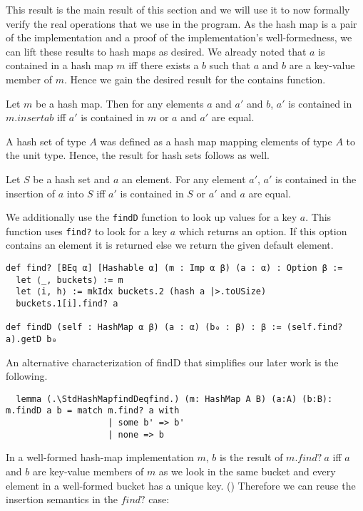 This result is the main result of this section and we will use it to now formally verify the real operations that we use in the program. As the hash map is a pair of the implementation and a proof of the implementation's well-formedness, we can lift these results to hash maps as desired. We already noted that $a$ is contained in a hash map $m$ iff there exists a $b$ such that $a$ and $b$ are a key-value member of $m$. Hence we gain the desired result for the contains function.

\begin{lemma}[\StdHashMapcontainsinsert]
  Let $m$ be a hash map. Then for any elements $a$ and $a'$ and $b$, $a'$ is contained in $m.insert a b$ iff $a'$ is contained in $m$ or $a$ and $a'$ are equal.
\end{lemma}

A hash set of type $A$ was defined as a hash map mapping elements of type $A$ to the unit type. Hence, the result for hash sets follows as well.

\begin{lemma}[\StdHashSetcontainsinsert]
  Let $S$ be a hash set and $a$ an element. For any element $a'$, $a'$ is contained in the insertion of $a$ into $S$ iff $a'$ is contained in $S$ or $a'$ and $a$ are equal.
\end{lemma}

We additionally use the \lstinline|findD| function to look up values for a key $a$. This function uses \lstinline|find?| to look for a key $a$ which returns an option. If this option contains an element it is returned else we return the given default element.

\begin{lstlisting}
def find? [BEq α] [Hashable α] (m : Imp α β) (a : α) : Option β :=
  let ⟨_, buckets⟩ := m
  let ⟨i, h⟩ := mkIdx buckets.2 (hash a |>.toUSize)
  buckets.1[i].find? a

def findD (self : HashMap α β) (a : α) (b₀ : β) : β := (self.find? a).getD b₀
\end{lstlisting}

An alternative characterization of findD that simplifies our later work is the following.

\begin{lstlisting}
  lemma (.\StdHashMapfindDeqfind.) (m: HashMap A B) (a:A) (b:B): m.findD a b = match m.find? a with
                    | some b' => b'
                    | none => b
\end{lstlisting}

In a well-formed hash-map implementation $m$, $b$ is the result of $m.find?\ a$ iff $a$ and $b$ are key-value members of $m$ as we look in the same bucket and every element in a well-formed bucket has a unique key. (\StdHashMapfindiffkv) Therefore we can reuse the insertion semantics in the $find?$ case:

